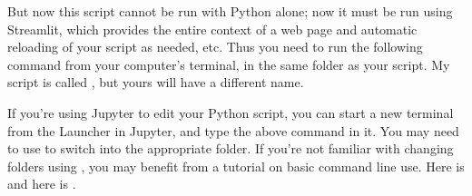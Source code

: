 \documentclass[letterpaper,10pt,english]{jupyterBook}
\begin{document}
\begin{sphinxVerbatim}[commandchars=\\\{\}]
   
   

  
       

   
  \PYG{p}{[}      \PYG{p}{]}
   

     
     
\end{sphinxVerbatim}

\sphinxAtStartPar
But now this script cannot be run with Python alone; now it must be run using Streamlit, which provides the entire context of a web page and automatic reloading of your script as needed, etc.  Thus you need to run the following command from your computer’s terminal, in the same folder as your script.  My script is called , but yours will have a different name.

\begin{sphinxVerbatim}[commandchars=\\\{\}]
  
\end{sphinxVerbatim}

\sphinxAtStartPar
If you’re using Jupyter to edit your Python script, you can start a new terminal from the Launcher in Jupyter, and type the above command in it.  You may need to use  to switch into the appropriate folder.  If you’re not familiar with changing folders using , you may benefit from a tutorial on basic command line use.  Here is  and here is .
\end{document}

